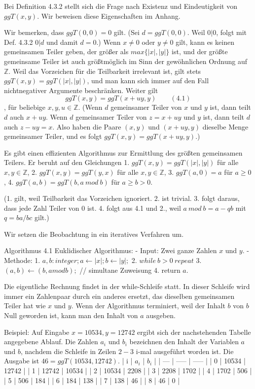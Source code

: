 \documentclass[a4paper]{article}
\begin{document}
\begin{multicols}{3}
    Bei Definition 4.3.2 stellt sich die Frage nach Existenz und Eindeutigkeit von $ggT(x,y)$. Wir beweisen diese Eigenschaften im Anhang.

    Wir bemerken, dass $ggT(0,0) = 0$ gilt. (Sei $d = ggT(0,0)$. Weil $0|0$, folgt mit Def. 4.3.2 $0|d$ und damit $d=0$.) Wenn $x\not= 0$ oder $y\not= 0$ gilt, kann es keinen gemeinsamen Teiler geben, der größer als $max\{|x|,|y|\}$ ist, und der größte gemeinsame Teiler ist auch größtmöglich im Sinn der gewöhnlichen Ordnung auf $\mathbb{Z}$. Weil das Vorzeichen für die Teilbarkeit irrelevant ist, gilt stets $ggT(x,y) = ggT(|x|,|y|)$, und man kann sich immer auf den Fall nichtnegativer Argumente beschränken. Weiter gilt $$ggT(x,y) = ggT(x+uy,y) \quad\quad(4.1)$$, für beliebige $x,y,u\in\mathbb{Z}$. (Wenn $d$ gemeinsamer Teiler von $x$ und $y$ ist, dann teilt $d$ auch $x+uy$. Wenn $d$ gemeinsamer Teiler von $z=x+uy$ und $y$ ist, dann teilt $d$ auch $z-uy =x$. Also haben die Paare $(x,y)$ und $(x+uy,y)$ dieselbe Menge gemeinsamer Teiler, und es folgt $ggT(x,y) = ggT(x+uy,y)$.)

    Es gibt einen effizienten Algorithmus zur Ermittlung des größten gemeinsamen Teilers. Er beruht auf den Gleichungen
    1. $ggT(x,y) = ggT(|x|,|y|)$ für alle $x,y\in\mathbb{Z}$,
    2. $ggT(x,y) = ggT(y,x)$ für alle $x,y\in\mathbb{Z}$,
    3. $ggT(a,0) =a$ für $a\geq 0$,
    4. $ggT(a,b) = ggT(b,a\ mod\ b)$ für $a\geq b >0$.

    (1. gilt, weil Teilbarkeit das Vorzeichen ignoriert. 2. ist trivial. 3. folgt daraus, dass jede Zahl Teiler von $0$ ist. 4. folgt aus 4.1 und 2., weil $a\ mod\ b=a-qb$ mit $q=ba/bc$ gilt.)

    Wir setzen die Beobachtung in ein iteratives Verfahren um.

    Algorithmus 4.1 Euklidischer Algorithmus:
    - Input: Zwei ganze Zahlen $x$ und $y$.
    - Methode:
    1. $a,b:integer;a\leftarrow |x|;b\leftarrow |y|;$
    2. $while\ b> 0\ repeat$
    3. $(a,b)\leftarrow (b,amodb);$ // simultane Zuweisung
    4. return $a$.

    Die eigentliche Rechnung findet in der while-Schleife statt. In dieser Schleife wird immer ein Zahlenpaar durch ein anderes ersetzt, das dieselben gemeinsamen Teiler hat wie $x$ und $y$. Wenn der Algorithmus terminiert, weil der Inhalt $b$ von $b$ Null geworden ist, kann man den Inhalt von $a$ ausgeben.

    Beispiel: Auf Eingabe $x=10534, y=12742$ ergibt sich der nachstehenden Tabelle angegebene Ablauf. Die Zahlen $a_i$ und $b_i$ bezeichnen den Inhalt der Variablen $a$ und $b$, nachdem die Schleife in Zeilen $2-3$ i-mal ausgeführt worden ist. Die Ausgabe ist $46 = ggT(10534,12742)$.
    | i   | $a_i$ | $b_i$ |
    | --- | ----- | ----- |
    | 0   | 10534 | 12742 |
    | 1   | 12742 | 10534 |
    | 2   | 10534 | 2208  |
    | 3   | 2208  | 1702  |
    | 4   | 1702  | 506   |
    | 5   | 506   | 184   |
    | 6   | 184   | 138   |
    | 7   | 138   | 46    |
    | 8   | 46    | 0     |



\end{multicols}
\end{document}
